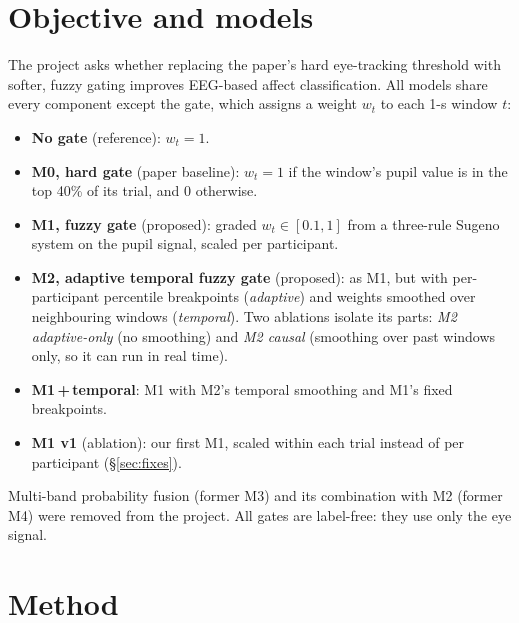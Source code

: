 \documentclass[10pt,a4paper]{article}
\begin{document}
\section{Objective and models}
The project asks whether replacing the paper's hard eye-tracking threshold with softer, fuzzy gating improves EEG-based affect classification. All models share every component except the gate, which assigns a weight $w_t$ to each 1-s window $t$:
\begin{itemize}
  \item \textbf{No gate} (reference): $w_t=1$.
  \item \textbf{M0, hard gate} (paper baseline): $w_t=1$ if the window's pupil value is in the top 40\% of its trial, and 0 otherwise.
  \item \textbf{M1, fuzzy gate} (proposed): graded $w_t\in[0.1,1]$ from a three-rule Sugeno system on the pupil signal, scaled per participant.
  \item \textbf{M2, adaptive temporal fuzzy gate} (proposed): as M1, but with per-participant percentile breakpoints (\emph{adaptive}) and weights smoothed over neighbouring windows (\emph{temporal}). Two ablations isolate its parts: \emph{M2 adaptive-only} (no smoothing) and \emph{M2 causal} (smoothing over past windows only, so it can run in real time).
  \item \textbf{M1\,+\,temporal}: M1 with M2's temporal smoothing and M1's fixed breakpoints.
  \item \textbf{M1 v1} (ablation): our first M1, scaled within each trial instead of per participant (\S\ref{sec:fixes}).
\end{itemize}
Multi-band probability fusion (former M3) and its combination with M2 (former M4) were removed from the project. All gates are label-free: they use only the eye signal.

\section{Method}
\end{document}
